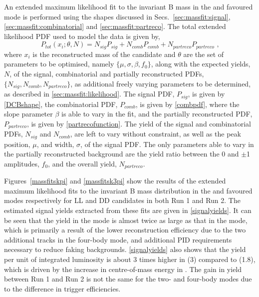 An extended maximum likelihood fit to the invariant B mass in the \kpi and \kpipipi favoured mode is performed using the shapes discussed in Secs.~\ref{sec:massfit:signal}, \ref{sec:massfit:combinatorial} and \ref{sec:massfit:partreco}. The total extended likelihood PDF used to model the data is given by,
\begin{equation}
P_{tot}(x_i;\theta, N) = N_{sig}P_{sig} + N_{comb}P_{comb} + N_{partreco}P_{partreco} \text{ ,}
\label{totalpdf}
\end{equation}
where $x_i$ is the reconstructed \Bm mass of the candidate and $\theta$ are the set of parameters to be optimised, namely $\{\mu, \sigma, \beta, f_0\}$, along with the expected yields, $N$, of the signal, combinatorial and partially reconstructed PDFs, $\{N_{sig}, N_{comb}, N_{partreco}\}$, as additional freely varying parameters to be determined, as described in \sect\ref{sec:massfit:likelihood}. The signal PDF, $P_{sig}$, is given by \eqn\ref{DCBshape}, the combinatorial PDF, $P_{comb}$, is given by \eqn\ref{combpdf}, where the slope parameter $\beta$ is able to vary in the fit, and the partially reconstructed PDF, $P_{partreco}$, is given by \eqn\ref{partrecofunction}. The yield of the signal and combinatorial PDFs, $N_{sig}$ and $N_{comb}$, are left to vary without constraint, as well as the peak position, $\mu$, and width, $\sigma$, of the signal PDF. The only parameters able to vary in the partially reconstructed background are the yield ratio between the 0 and $\pm$1 amplitudes, $f_0$, and the overall yield, $N_{partreco}$.

Figures~\ref{massfitskpi} and \ref{massfitsk3pi} show the results of the extended maximum likelihood fits to the invariant B mass distribution in the \kpi and \kpipipi favoured modes respectively for LL and DD candidates in both Run 1 and Run 2. The estimated signal yields extracted from these fits are given in \tab\ref{signalyields}. It can be seen that the yield in the \kpi mode is almost twice as large as that in the \kpipipi mode, which is primarily a result of the lower reconstruction efficiency due to the two additional tracks in the four-body mode, and additional PID requirements necessary to reduce faking backgrounds. \Tab\ref{signalyields} also shows that the yield per unit of integrated luminosity is about 3 times higher in \runone (3\invfb) compared to \runtwo (1.8\invfb), which is driven by the increase in centre-of-mass energy in \runtwo. The gain in yield between Run 1 and Run 2 is not the same for the two- and four-body modes due to the difference in trigger efficiencies.


